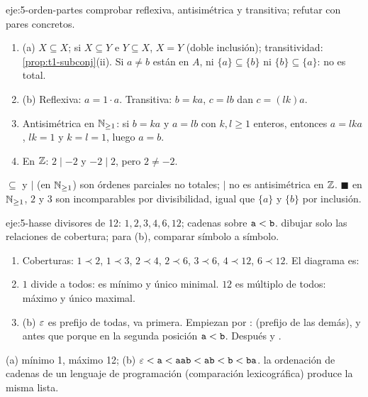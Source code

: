 \begin{solucion}{eje:5-orden-partes}
\planteamiento comprobar reflexiva, antisimétrica y transitiva; refutar con pares concretos.
\pasos
\begin{enumerate}[label=\arabic*.]
  \item (a) $X\subseteq X$; si $X\subseteq Y$ e $Y\subseteq X$, $X=Y$ (doble inclusión); transitividad: \cref{prop:t1-subconj}(ii). Si $a\neq b$ están en $A$, ni $\{a\}\subseteq\{b\}$ ni $\{b\}\subseteq\{a\}$: no es total.
  \item (b) Reflexiva: $a=1\cdot a$. Transitiva: $b=ka$, $c=lb$ dan $c=(lk)a$.
  \item Antisimétrica en $\mathbb{N}_{\ge1}$: si $b=ka$ y $a=lb$ con $k,l\ge1$ enteros, entonces $a=lka$, $lk=1$ y $k=l=1$, luego $a=b$.
  \item En $\mathbb{Z}$: $2\mid-2$ y $-2\mid2$, pero $2\neq-2$.
\end{enumerate}
\resultado $\subseteq$ y $\mid$ (en $\mathbb{N}_{\ge1}$) son órdenes parciales no totales; $\mid$ no es antisimétrica en $\mathbb{Z}$. \hfill$\blacksquare$
\comprobacion en $\mathbb{N}_{\ge1}$, $2$ y $3$ son incomparables por divisibilidad, igual que $\{a\}$ y $\{b\}$ por inclusión.
\end{solucion}

\begin{solucion}{eje:5-hasse}
\datos divisores de 12: $1,2,3,4,6,12$; cadenas sobre $\texttt{a}<\texttt{b}$.
\planteamiento dibujar solo las relaciones de cobertura; para (b), comparar símbolo a símbolo.
\pasos
\begin{enumerate}[label=\arabic*.]
  \item Coberturas: $1\prec2$, $1\prec3$, $2\prec4$, $2\prec6$, $3\prec6$, $4\prec12$, $6\prec12$. El diagrama es:
  \begin{center}
  \end{center}
  \item $1$ divide a todos: es mínimo y único minimal. $12$ es múltiplo de todos: máximo y único maximal.
  \item (b) $\varepsilon$ es prefijo de todas, va primera. Empiezan por :  (prefijo de las demás), y  antes que  porque en la segunda posición $\texttt{a}<\texttt{b}$. Después  y .
\end{enumerate}
\resultado (a) mínimo 1, máximo 12; (b) $\varepsilon<\texttt{a}<\texttt{aab}<\texttt{ab}<\texttt{b}<\texttt{ba}$.
\comprobacion la ordenación de cadenas de un lenguaje de programación (comparación lexicográfica) produce la misma lista.
\end{solucion}


